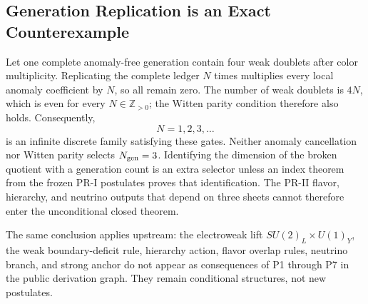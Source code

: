 \subsection{Generation Replication is an Exact Counterexample}

Let one complete anomaly-free generation contain four weak doublets after color multiplicity.  Replicating the complete ledger $N$ times multiplies every local anomaly coefficient by $N$, so all remain zero.  The number of weak doublets is $4N$, which is even for every $N\in\mathbb Z_{>0}$; the Witten \cite{Witten_1982} parity condition therefore also holds.  Consequently,
\begin{equation}
 N=1,2,3,\ldots
\end{equation}
is an infinite discrete family satisfying these gates.  Neither anomaly cancellation nor Witten parity selects $N_{\rm gen}=3$.  Identifying the dimension of the broken quotient with a generation count is an extra selector unless an index theorem from the frozen PR-I postulates proves that identification.  The PR-II flavor, hierarchy, and neutrino outputs that depend on three sheets cannot therefore enter the unconditional closed theorem.

The same conclusion applies upstream: the electroweak lift $SU(2)_L\times U(1)_Y$, the weak boundary-deficit rule, hierarchy action, flavor overlap rules, neutrino branch, and strong anchor do not appear as consequences of P1 through P7 in the public derivation graph.  They remain conditional structures, not new postulates.
